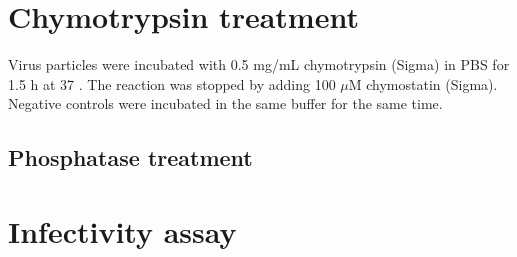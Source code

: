 \section{Chymotrypsin treatment}

Virus particles were incubated with 0.5 mg/mL chymotrypsin (Sigma) in PBS for 1.5 h at 37 \textcelsius. The reaction was stopped by adding 100 $\mu$M chymostatin (Sigma). Negative controls were incubated in the same buffer for the same time.


\subsection{Phosphatase treatment}
 


\section{Infectivity assay}


\subsection{}



\subsection{}

